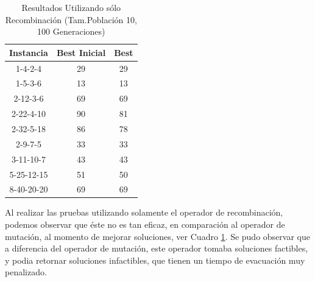 \documentclass[letter, 10pt]{article}
\begin{document}
\begin{table}[]
\centering
\begin{tabular}{c|cc}
\hline
 Instancia & Best Inicial & Best  \\
     \hline
    1-4-2-4     &   29  &   29  \\
    1-5-3-6     &   13  &   13  \\
    2-12-3-6    &   69  &   69  \\
    2-22-4-10   &   90  &   81  \\ 
    2-32-5-18   &   86  &   78  \\
    2-9-7-5     &   33  &   33  \\
    3-11-10-7   &   43  &   43  \\
    5-25-12-15  &   51  &   50  \\
    8-40-20-20  &   69  &   69 
\end{tabular}
\caption{Resultados Utilizando sólo Recombinación (Tam.Población 10, 100 Generaciones)}
\label{tab:cross}
\end{table}

Al realizar las pruebas utilizando solamente el operador de recombinación, podemos observar que éste no es tan eficaz, en comparación al operador de mutación, al momento de mejorar soluciones, ver Cuadro \ref{tab:cross}. Se pudo observar que a diferencia del operador de mutación, este operador tomaba soluciones factibles, y podia retornar soluciones infactibles, que tienen un tiempo de evacuación muy penalizado.
\end{document}
